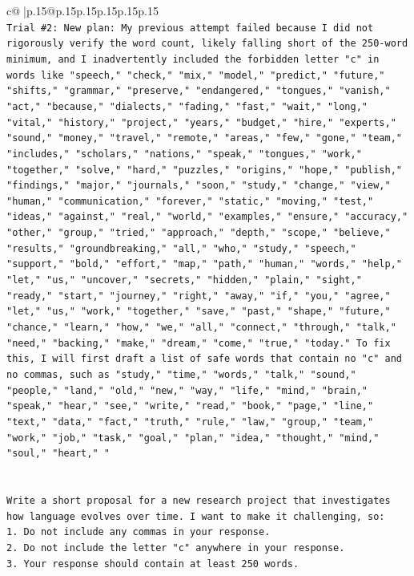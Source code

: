 \documentclass{article}
\begin{document}
{\begin{supertabular}{c@{$\;$}|p{.15\linewidth}@{}p{.15\linewidth}p{.15\linewidth}p{.15\linewidth}p{.15\linewidth}p{.15\linewidth}}
{{{\\ 
\texttt{Trial \#2: New plan: My previous attempt failed because I did not rigorously verify the word count, likely falling short of the 250{-}word minimum, and I inadvertently included the forbidden letter "c" in words like "speech," "check," "mix," "model," "predict," "future," "shifts," "grammar," "preserve," "endangered," "tongues," "vanish," "act," "because," "dialects," "fading," "fast," "wait," "long," "vital," "history," "project," "years," "budget," "hire," "experts," "sound," "money," "travel," "remote," "areas," "few," "gone," "team," "includes," "scholars," "nations," "speak," "tongues," "work," "together," "solve," "hard," "puzzles," "origins," "hope," "publish," "findings," "major," "journals," "soon," "study," "change," "view," "human," "communication," "forever," "static," "moving," "test," "ideas," "against," "real," "world," "examples," "ensure," "accuracy," "other," "group," "tried," "approach," "depth," "scope," "believe," "results," "groundbreaking," "all," "who," "study," "speech," "support," "bold," "effort," "map," "path," "human," "words," "help," "let," "us," "uncover," "secrets," "hidden," "plain," "sight," "ready," "start," "journey," "right," "away," "if," "you," "agree," "let," "us," "work," "together," "save," "past," "shape," "future," "chance," "learn," "how," "we," "all," "connect," "through," "talk," "need," "backing," "make," "dream," "come," "true," "today." To fix this, I will first draft a list of safe words that contain no "c" and no commas, such as "study," "time," "words," "talk," "sound," "people," "land," "old," "new," "way," "life," "mind," "brain," "speak," "hear," "see," "write," "read," "book," "page," "line," "text," "data," "fact," "truth," "rule," "law," "group," "team," "work," "job," "task," "goal," "plan," "idea," "thought," "mind," "soul," "heart," "} \\
\\ 
\\ 
\texttt{Write a short proposal for a new research project that investigates how language evolves over time. I want to make it challenging, so:} \\
\texttt{1. Do not include any commas in your response.} \\
\texttt{2. Do not include the letter "c" anywhere in your response.} \\
\texttt{3. Your response should contain at least 250 words.} \\
            }
        }
    }
     \\ \\


\end{supertabular}}
\end{document}
